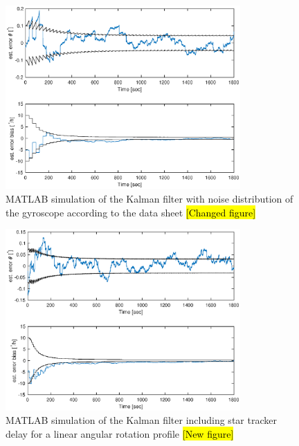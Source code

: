 \begin{figure}[htb]
	\centering
	\includegraphics[width = 0.8\textwidth]{4-experiment-design/img/software/kf_30_0_lin.eps}
	\caption{MATLAB simulation of the Kalman filter with noise distribution of the gyroscope according to the data sheet \hl{[Changed figure]}}
	\label{fig::software::Kalman_filter}
\end{figure}
\begin{figure}[htb]
	\centering
	\includegraphics[width = 0.8\textwidth]{4-experiment-design/img/software/kf_10_8_lin.eps}
	\caption{MATLAB simulation of the Kalman filter including star tracker delay for a linear angular rotation profile \hl{[New figure]}}
	\label{fig::software::Kalman_filter_delay_1}
\end{figure}
